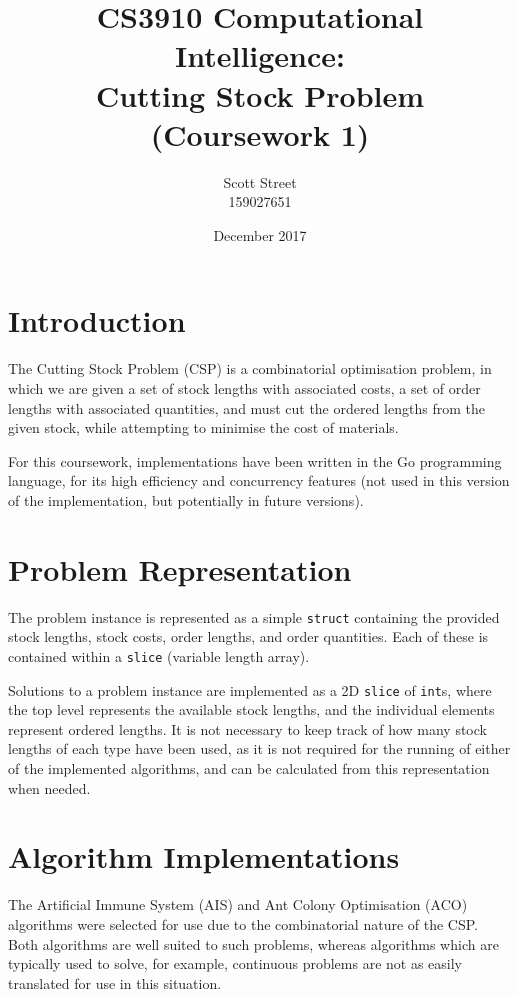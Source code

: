 \documentclass{article}
\title{CS3910 Computational Intelligence:\\Cutting Stock Problem (Coursework 1)}
\author{Scott Street\\{\small 159027651}}
\date{December 2017}
\begin{document}
\maketitle

\section{Introduction}

  The Cutting Stock Problem (CSP) is a combinatorial optimisation problem, in which we are given a set of stock lengths with associated costs, a set of order lengths with associated quantities, and must cut the ordered lengths from the given stock, while attempting to minimise the cost of materials.

  \bigskip

  For this coursework, implementations have been written in the Go programming language, for its high efficiency and concurrency features (not used in this version of the implementation, but potentially in future versions).

\section{Problem Representation}

  The problem instance is represented as a simple \lstinline{struct} containing the provided stock lengths, stock costs, order lengths, and order quantities. Each of these is contained within a \lstinline{slice} (variable length array).

  \bigskip

  Solutions to a problem instance are implemented as a 2D \lstinline{slice} of \lstinline{int}s, where the top level represents the available stock lengths, and the individual elements represent ordered lengths. It is not necessary to keep track of how many stock lengths of each type have been used, as it is not required for the running of either of the implemented algorithms, and can be calculated from this representation when needed.

\section{Algorithm Implementations}

  The Artificial Immune System (AIS) and Ant Colony Optimisation (ACO) algorithms were selected for use due to the combinatorial nature of the CSP. Both algorithms are well suited to such problems, whereas algorithms which are typically used to solve, for example, continuous problems are not as easily translated for use in this situation.
\end{document}
